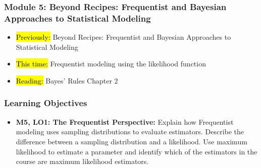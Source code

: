 
\begin{frame}
    \frametitle{Module 5: Beyond Recipes: Frequentist and Bayesian Approaches to Statistical Modeling}
    \begin{itemize}
        \item \hl{Previously: }Beyond Recipes: Frequentist and Bayesian Approaches to Statistical Modeling
        \item \hl{This time: }Frequentist modeling using the likelihood function
        \item \hl{Reading: }Bayes' Rules Chapter 2
    \end{itemize}

\end{frame}
\begin{frame}
    \frametitle{Learning Objectives}
    \begin{itemize}
        \item \textbf{M5, LO1: The Frequentist Perspective:} Explain how Frequentist modeling uses sampling distributions to evaluate estimators. Describe the difference between a sampling distribution and a likelihood. Use maximum likelihood to estimate a parameter and identify which of the estimators in the course are maximum likelihood estimators.
    \end{itemize}
\end{frame}
